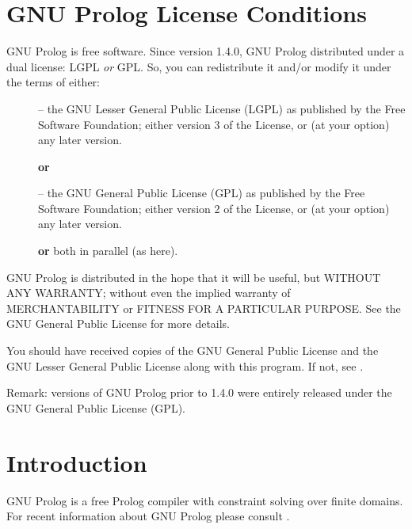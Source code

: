 \newpage
\section{GNU Prolog License Conditions}

GNU Prolog is free software. Since version 1.4.0, GNU Prolog distributed under
a dual license: LGPL \textit{or} GPL. So, you can redistribute it and/or
modify it under the terms of either:

\begin{description}

\item[] -- the GNU Lesser General Public License (LGPL) as published by the Free
  Software Foundation; either version 3 of the License, or (at your
  option) any later version. 

\item[] \textbf{or} 

\item[] -- the GNU General Public License (GPL) as published by the Free
  Software Foundation; either version 2 of the License, or (at your option)
  any later version.

\item[] \textbf{or} both in parallel (as here). 
\end{description}

GNU Prolog is distributed in the hope that it will be useful,
but WITHOUT ANY WARRANTY; without even the implied warranty of
MERCHANTABILITY or FITNESS FOR A PARTICULAR PURPOSE.  See the GNU
General Public License for more details.

You should have received copies of the GNU General Public License and
the GNU Lesser General Public License along with this program. If
not, see .

Remark: versions of GNU Prolog prior to 1.4.0 were entirely released under
the GNU General Public License (GPL).

\section{Introduction}

GNU Prolog \cite{gnu-prolog} is a free Prolog compiler with constraint
solving over finite domains.  For recent information about GNU Prolog
please consult .

